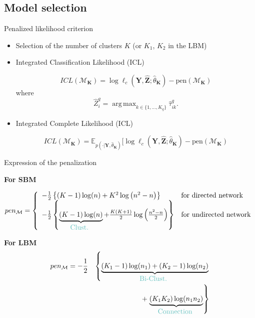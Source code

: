 \documentclass[compress,10pt]{beamer}
\DeclareMathOperator*{\argmax}{arg\,max}
\newcommand{\pen}{\mathrm{pen}}
\newcommand{\bY}{\mathbf{Y}}
\newcommand{\M}{\mathcal{M}_{\bK}}
\newcommand{\bK}{\mathbf{K}}
\newcommand{\Xall}{\mathbf{Y}}
\newcommand{\bZ}{\mathbf{Z}}
\begin{document}
 \subsection{Model selection}
 \begin{frame}{ Penalized likelihood criterion}

 \begin{itemize}
 \item  Selection of the number of clusters  $K$ (or $K_1$, $K_2$ in the LBM)
\item   Integrated Classification Likelihood (ICL)   \textcolor{blue}{\cite{biernacki2000assessing}}
 

\begin{equation}\label{eq:ICL}
ICL(\M) =\log  \ell_c(\Xall,\hat{\bZ}; \hat \theta_{\bK})-  \pen(\M)
\end{equation}
 where  \begin{equation}\label{eq:Zhat}
\hat{Z}_i ^q = \argmax_{k \in \{1, \dots, K_q\}}  \hat{\tau}_{ik}^q. 
\end{equation} 
\item   Integrated Complete Likelihood (ICL)  %

 

\begin{equation}\label{eq:ICL}
ICL(\M) =\mathbb{E}_{p(\cdot | \bY, \hat \theta_{\bK})}[\log  \ell_c(\Xall,\hat{\bZ}; \hat \theta_{\bK})-  \pen(\M)
\end{equation}
 \end{itemize}

\end{frame}


 \begin{frame}{Expression of the penalization}
 
\textcolor{dgreen}{ \textbf{For SBM } }

$$ pen_{\mathcal{M}} = \left\{ 
\begin{array}{ll}
- \frac{1}{2}\left\{ (K-1)\log(n)  +K^2   \log \left( n^2-n \right)\right\} & \mbox{for directed network}\\
 - \frac{1}{2}\left\{ \underbrace{(K-1)\log(n) }_{\mbox{\textcolor{dgreen}{Clust. }}} + \frac{K(K+1)}{2}   \log \left(\frac{ n^2-n }{2}\right)\right\} & \mbox{for undirected network}\\
\end{array}
\right.
$$
 

\textcolor{dgreen}{ \textbf{For LBM } }
%
\begin{eqnarray*}
 pen_{\mathcal{M}} =  -  \frac{1}{2}&& \left\{  \underbrace{ (K_1-1)\log(n_1) +  (K_2-1)\log(n_2)  }_{\mbox{\textcolor{dgreen}{Bi-Clust. }}} \right. \\
& &  + \left. \underbrace{ (K_1  K_2)    \log ( n_1   n_2)} _{\mbox{\textcolor{dgreen}{Connection }}} \right\} 
 \end{eqnarray*}

\end{frame}
 
\end{document}
